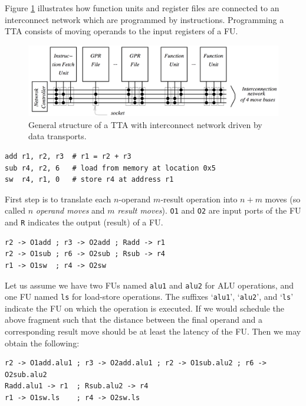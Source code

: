 Figure \ref{fig:tta} illustrates how function units and register files are connected to an interconnect network which are programmed by instructions. Programming a TTA consists of moving operands to the input registers of a FU.

\begin{figure}[b!]
\centering
\includegraphics[width=.8\textwidth]{figures/tta_structure}
\caption{General structure of a TTA with interconnect network driven by data transports.}
\label{fig:tta}
\end{figure}

\begin{lstlisting}
add r1, r2, r3  # r1 = r2 + r3
sub r4, r2, 6   # load from memory at location 0x5
sw  r4, r1, 0   # store r4 at address r1
\end{lstlisting}

First step is to translate each $n$-operand $m$-result operation into $n+m$ moves (so called $n$ \emph{operand moves} and $m$ \emph{result moves}). \texttt{O1} and \texttt{O2} are input ports of the FU and \texttt{R} indicates the output (result) of a FU.

\begin{lstlisting}
r2 -> O1add ; r3 -> O2add ; Radd -> r1
r2 -> O1sub ; r6 -> O2sub ; Rsub -> r4
r1 -> O1sw  ; r4 -> O2sw
\end{lstlisting}

Let us assume we have two FUs named \texttt{alu1} and \texttt{alu2} for ALU operations, and one FU named \texttt{ls} for load-store operations. The suffixes `\texttt{alu1}', `\texttt{alu2}', and `\texttt{ls}' indicate the FU on which the operation is executed.
If we would schedule the above fragment such that the distance between the final operand and a corresponding result move should be at least the latency of the FU. Then we may obtain the following:

\begin{lstlisting}
r2 -> O1add.alu1 ; r3 -> O2add.alu1 ; r2 -> O1sub.alu2 ; r6 -> O2sub.alu2
Radd.alu1 -> r1  ; Rsub.alu2 -> r4
r1 -> O1sw.ls    ; r4 -> O2sw.ls
\end{lstlisting}


